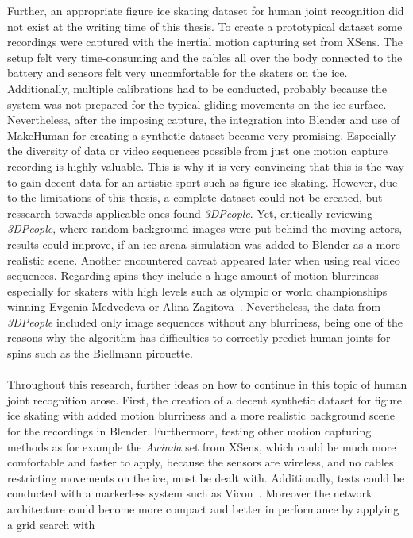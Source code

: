 Further, an appropriate figure ice skating dataset for human joint recognition did not exist at the writing time of
this thesis.
To create a prototypical dataset some recordings were captured with the inertial motion capturing set from XSens.
The setup felt very time-consuming and the cables all over the body connected to the battery and sensors felt very
uncomfortable
for the skaters on the ice.
Additionally, multiple calibrations had to be conducted, probably because the system was not prepared
for the typical gliding movements on the ice surface.
Nevertheless, after the imposing capture, the integration into Blender and use of MakeHuman for creating a synthetic
dataset
became very promising.
Especially the diversity of data or video sequences possible from just one motion capture recording is highly valuable.
This is why it is very convincing that this is the way to gain decent data for an artistic sport such as figure
ice skating.
However, due to the limitations of this thesis, a complete dataset could not be created, but ressearch towards
applicable ones
found \textit{3DPeople}.
Yet, critically reviewing \textit{3DPeople}, where random background images were put behind the moving actors,
results could improve, if an ice arena simulation was added to Blender as a more realistic scene.
Another encountered caveat appeared later when using real video sequences.
Regarding spins they include a huge amount of motion blurriness especially for skaters with high levels such as
olympic or world championships winning
Evgenia Medvedeva or Alina Zagitova~\cite{2018world}.
Nevertheless, the data from \textit{3DPeople} included only image sequences without any blurriness, being one of the
reasons why
the algorithm has difficulties to correctly predict human joints for spins such as the Biellmann pirouette.
\\\mbox{}\\
Throughout this research, further ideas on how to continue in this topic of human joint recognition arose.
First, the creation of a decent synthetic dataset for figure ice skating with added motion blurriness and a more
realistic
background scene for the recordings in Blender.
Furthermore, testing other motion capturing methods as for example the \textit{Awinda} set from XSens, which could be
much more comfortable
and faster to apply, because the sensors are wireless, and no cables restricting movements on the ice, must be dealt
with.
Additionally, tests could be conducted with a markerless system such as Vicon~\cite{mocapoptical}.
Moreover the network architecture could become more compact and better in performance by applying a grid search with
